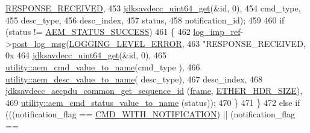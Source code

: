 \begin{DoxyCode}
{      \hyperlink{namespaceavdecc__lib_ad2a3e740ca3019cf9fd0f9514afb6419a76526acf7fff481667c4ec404347c3ce}{RESPONSE\_RECEIVED},
453                                                     \hyperlink{group__endian_gac8c2b48b7d7db101708e0197e366ac42}{jdksavdecc\_uint64\_get}(&\textcolor{keywordtype}{id}, 0),
454                                                     cmd\_type,
455                                                     desc\_type,
456                                                     desc\_index,
457                                                     status,
458                                                     notification\_id);
459 
460         \textcolor{keywordflow}{if} (status != \hyperlink{namespaceavdecc__lib_affd436edb2cecd20cfd784a84f852b2bac947077909cb590b84f4b5db413080e0}{AEM\_STATUS\_SUCCESS})
461         \{
462             \hyperlink{namespaceavdecc__lib_acbe3e2a96ae6524943ca532c87a28529}{log\_imp\_ref}->\hyperlink{classavdecc__lib_1_1log_a68139a6297697e4ccebf36ccfd02e44a}{post\_log\_msg}(\hyperlink{namespaceavdecc__lib_a501055c431e6872ef46f252ad13f85cdaf2c4481208273451a6f5c7bb9770ec8a}{LOGGING\_LEVEL\_ERROR},
463                                       \textcolor{stringliteral}{"RESPONSE\_RECEIVED, 0x%
464                                       \hyperlink{group__endian_gac8c2b48b7d7db101708e0197e366ac42}{jdksavdecc\_uint64\_get}(&\textcolor{keywordtype}{id}, 0),
465                                       \hyperlink{namespaceavdecc__lib_1_1utility_a4c304db966bad783728a6a9e0aefed18}{utility::aem\_cmd\_value\_to\_name}(cmd\_type
      ),
466                                       \hyperlink{namespaceavdecc__lib_1_1utility_a6bdd02679e5a911a071d4aa03be341f0}{utility::aem\_desc\_value\_to\_name}(
      desc\_type),
467                                       desc\_index,
468                                       \hyperlink{group__aecpdu__common_ga4c5015b65543e4753c336d98b63fea28}{jdksavdecc\_aecpdu\_common\_get\_sequence\_id}
      (\hyperlink{gst__avb__playbin_8c_ac8e710e0b5e994c0545d75d69868c6f0}{frame}, \hyperlink{namespaceavdecc__lib_a6c827b1a0d973e18119c5e3da518e65ca9512ad9b34302ba7048d88197e0a2dc0}{ETHER\_HDR\_SIZE}),
469                                       \hyperlink{namespaceavdecc__lib_1_1utility_aca66a547b66fdb27f3221ad0844d60c6}{utility::aem\_cmd\_status\_value\_to\_name}
      (status));
470         \}
471     \}
472     \textcolor{keywordflow}{else} \textcolor{keywordflow}{if} (((notification\_flag == \hyperlink{namespaceavdecc__lib_aabcadff06aa62be0ce47bc0646823604aba48b8a017e06fb240b650cdea965178}{CMD\_WITH\_NOTIFICATION}) || (notification\_flag == 
}}
\end{DoxyCode}
